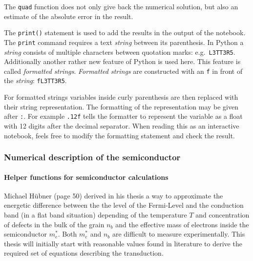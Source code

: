 \documentclass[11pt]{article}
\begin{document}
The \texttt{quad} function does not only give back the numerical
solution, but also an estimate of the absolute error in the result.

The \texttt{print()} statement is used to add the results in the output
of the notebook. The \texttt{print} command requires a text
\emph{string} between its parenthesis. In Python a \emph{string}
consists of multiple characters between quotation marks:
e.g.~\texttt{\textquotesingle{}L3TT3R5\textquotesingle{}}. Additionally
another rather new feature of Python is used here. This feature is
called \emph{formatted strings}. \emph{Formatted strings} are
constructed with an \texttt{f} in front of the \emph{string}:
\texttt{f\textquotesingle{}L3TT3R5\textquotesingle{}}.

For formatted strings variables inside curly parenthesis are then
replaced with their string representation. The formatting of the
representation may be given after \texttt{:}. For example \texttt{.12f}
tells the formatter to represent the variable as a float with 12 digits
after the decimal separator. When reading this as an interactive
notebook, feels free to modify the formatting statement and check the
result.

    \hypertarget{numerical-description-of-the-semiconductor}{%
\subsubsection{Numerical description of the
semiconductor}\label{numerical-description-of-the-semiconductor}}

    \hypertarget{helper-functions-for-semiconductor-calculations}{%
\paragraph{Helper functions for semiconductor
calculations}\label{helper-functions-for-semiconductor-calculations}}

Michael Hübner (page 50) derived in his thesis a way to approximate the
energetic difference between the the level of the Fermi-Level and the
conduction band (in a flat band situation) depending of the temperature
\(T\) and concentration of defects in the bulk of the grain \(n_b\) and
the effective mass of electrons inside the semiconductor \(m_e^*\). Both
\(m_e^*\) and \(n_b\) are difficult to measure experimentally. This
thesis will initially start with reasonable values found in literature
to derive the required set of equations describing the transduction.
\end{document}
